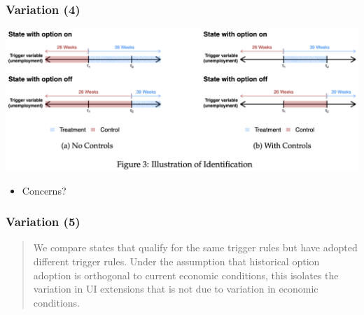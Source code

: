 \documentclass[english,xcolor=svgnames]{beamer}
\begin{document}
\begin{frame}
	\frametitle[alignment=center]{Variation (4)}
	\begin{center}
		\includegraphics[scale=0.3]{figures/AMNSFIG3.png}
	\end{center}
	\begin{itemize}
		\item Concerns?
	\end{itemize}
\end{frame}

\begin{frame}
	\frametitle[alignment=center]{Variation (5)}
	\begin{quote}
		We compare states that qualify for the same trigger rules but have adopted different trigger rules. Under the assumption that historical option adoption is orthogonal to current economic conditions, this isolates the variation in UI extensions that is not due to variation in economic conditions.
	\end{quote}
\end{frame}
\end{document}
